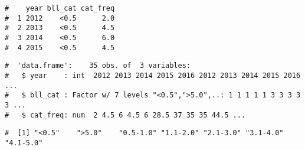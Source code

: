 \documentclass[letterpaper,12pt,twoside,]{pinp}
\begin{document}
\begin{Shaded}
\begin{Highlighting}[]
 \NormalTok{)}
\end{Highlighting}
\end{Shaded}

\begin{ShadedResult}
\begin{verbatim}
#    year bll_cat cat_freq
#  1 2012    <0.5      2.0
#  2 2013    <0.5      4.5
#  3 2014    <0.5      6.0
#  4 2015    <0.5      4.5
\end{verbatim}
\end{ShadedResult}

\begin{Shaded}
\begin{Highlighting}[]
\end{Highlighting}
\end{Shaded}

\begin{ShadedResult}
\begin{verbatim}
#  'data.frame':    35 obs. of  3 variables:
#   $ year    : int  2012 2013 2014 2015 2016 2012 2013 2014 2015 2016 ...
#   $ bll_cat : Factor w/ 7 levels "<0.5",">5.0",..: 1 1 1 1 1 3 3 3 3 3 ...
#   $ cat_freq: num  2 4.5 6 4.5 6 28.5 37 35 35 44.5 ...
\end{verbatim}
\end{ShadedResult}

\begin{Shaded}
\begin{Highlighting}[]
\OperatorTok{$}
\end{Highlighting}
\end{Shaded}

\begin{ShadedResult}
\begin{verbatim}
#  [1] "<0.5"    ">5.0"    "0.5-1.0" "1.1-2.0" "2.1-3.0" "3.1-4.0" "4.1-5.0"
\end{verbatim}
\end{ShadedResult}





\end{document}
